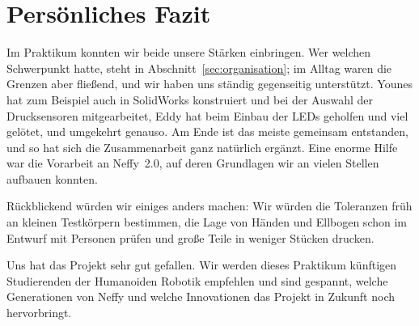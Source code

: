 \section{Persönliches Fazit}

Im Praktikum konnten wir beide unsere Stärken einbringen. Wer welchen Schwerpunkt hatte, steht in
Abschnitt~\ref{sec:organisation}; im Alltag waren die Grenzen aber fließend, und wir haben uns
ständig gegenseitig unterstützt. Younes hat zum Beispiel auch in SolidWorks konstruiert und bei
der Auswahl der Drucksensoren mitgearbeitet, Eddy hat beim Einbau der \acp{LED} geholfen und viel
gelötet, und umgekehrt genauso. Am Ende ist das meiste gemeinsam entstanden, und so hat sich die
Zusammenarbeit ganz natürlich ergänzt. Eine enorme Hilfe war die Vorarbeit an Neffy~2.0, auf
deren Grundlagen wir an vielen Stellen aufbauen konnten.

Rückblickend würden wir einiges anders machen: Wir würden die Toleranzen früh an kleinen
Testkörpern bestimmen, die Lage von Händen und Ellbogen schon im Entwurf mit Personen prüfen und
große Teile in weniger Stücken drucken.

Uns hat das Projekt sehr gut gefallen. Wir werden dieses Praktikum künftigen Studierenden der
Humanoiden Robotik empfehlen und sind gespannt, welche Generationen von Neffy und welche
Innovationen das Projekt in Zukunft noch
hervorbringt.
